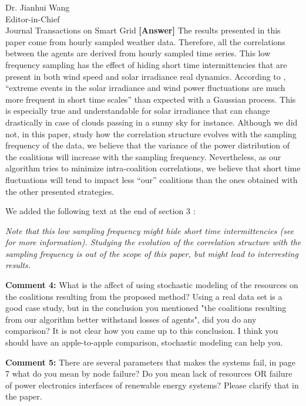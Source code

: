 \documentclass{letter}
\begin{document}
\begin{letter}{Dr. Jianhui Wang \\ Editor-in-Chief \\ Journal Transactions on Smart Grid }
\textbf{[Answer]} The results presented in this paper come from hourly sampled weather data. Therefore, all the correlations between the agents are derived from hourly sampled time series. This low frequency sampling has the effect of hiding short time intermittencies that are present in both wind speed and solar irradiance real dynamics. According to \cite{Anvari2015}, “extreme events in the solar irradiance and wind power fluctuations are much more frequent in short time scales” than expected with a Gaussian process. This is especially true and understandable for solar irradiance that can change drastically in case of clouds passing in a sunny sky for instance. Although we did not, in this paper, study how the correlation structure evolves with the sampling frequency of the data, we believe that the variance of the power distribution of the coalitions will increase with the sampling frequency. Nevertheless, as our algorithm tries to minimize intra-coalition correlations, we believe that short time fluctuations will tend to impact less “our” coalitions than the ones obtained with the other presented strategies. 

We added the following text at the end of section 3 : 

\textit{Note that this low sampling frequency might hide short time intermittencies (see \cite{Anvari2015} for more information). Studying the evolution of the correlation structure with the sampling frequency is out of the scope of this paper, but might lead to interresting results.}

\textbf{Comment 4:} What is the affect of using stochastic modeling of the resources on the coalitions resulting from the proposed method? Using a real data set is a good case study, but in the conclusion you mentioned "the coalitions resulting from our algorithm better withstand losses of agents", did you do any comparison? It is not clear how you came up to this conclusion. I think you should have an apple-to-apple comparison, stochastic modeling can help you.


\textbf{Comment 5:} There are several parameters that makes the systems fail, in page 7 what do you mean by node failure? Do you mean lack of resources OR failure of power electronics interfaces of renewable energy systems? Please clarify that in the paper.



\end{letter}
\end{document}
